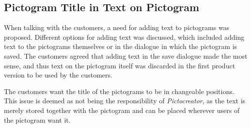 \subsection{Pictogram Title in Text on Pictogram}
When talking with the customers, a need for adding text to pictograms was proposed. 
Different options for adding text was discussed, which included adding text to the pictograms themselves or in the dialogue in which the pictogram is saved.
The customers agreed that adding text in the save dialogue made the most sense, and thus text on the pictogram itself was discarded in the first product version to be used by the customers.

The customers want the title of the pictograms to be in changeable positions. 
This issue is deemed as not being the responsibility of \textit{Pictocreator}, as the text is merely stored together with the pictogram and can be placed wherever users of the pictogram want it.